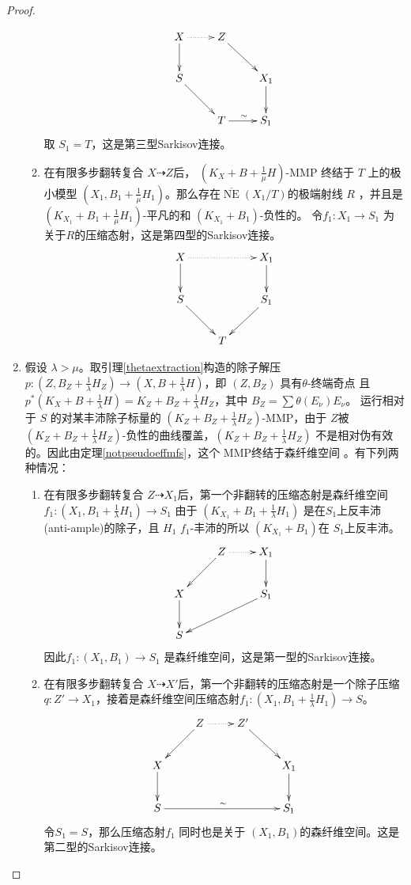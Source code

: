 \begin{proof}
\begin{enumerate}
\begin{enumerate}
      \[ \xymatrix{
          X\ar@{.>}[r]\ar[d]& Z\ar[rd] \\
          S\ar[rd]& & X_{1}\ar[d]\\
               &T\ar[r]^{\sim}& S_{1} } \]
            取 $ S_1=T $，这是第三型Sarkisov连接。
      \item 在有限多步翻转复合 $ X\dashrightarrow Z $后，  $(K_{X}+B+\frac{1}{\mu}H)$-MMP 终结于 $T$ 上的极小模型 $ (X_1,B_1+\frac{1}{\mu}H_1) $。那么存在$ \overline{\operatorname{NE}}(X_1/T) $的极端射线 $R$ ，并且是 $ (K_{X_1}+B_1+\frac{1}{\mu}H_1) $-平凡的和 $ (K_{X_1}+B_1) $-负性的。
            令$ f_1:X_1\to S_1 $ 为 关于$R$的压缩态射，这是第四型的Sarkisov连接。
            \[ \xymatrix{
                X\ar@{.>}[rr]\ar[d]& &X_{1}\ar[d] \\
                S\ar[rd]& & S_{1}\ar[ld]\\
                  &T& } \]
    \end{enumerate}
  \item 假设 $\lambda>\mu$。取引理\ref{thetaextraction}构造的除子解压 $ p:(Z,B_Z+\frac{1}{\lambda}H_Z)\to (X,B+\frac{1}{\lambda}H) $，即   $ (Z,B_Z) $ 具有$ \theta $-终端奇点 且 $ p^*(K_X+B+\frac{1}{\lambda}H)=K_Z+B_Z+\frac{1}{\lambda}H_Z $，其中 $ B_Z=\sum\theta(E_{\nu})E_\nu $。
    运行相对于 $S$ 的对某丰沛除子标量的 $ (K_Z+B_Z+\frac{1}{\lambda}H_Z) $-MMP，由于 $Z$被 $ (K_Z+B_Z+\frac{1}{\lambda}H_Z) $-负性的曲线覆盖，$ (K_Z+B_Z+\frac{1}{\lambda}H_Z) $ 不是相对伪有效的。因此由定理\ref{notpseudoeffmfs}，这个 MMP终结于森纤维空间 。有下列两种情况：
    \begin{enumerate}
      \item 在有限多步翻转复合 $ Z\dashrightarrow X_1 $后，第一个非翻转的压缩态射是森纤维空间$f_1:(X_1,B_1+\frac{1}{\lambda}H_1)\to S_1$ 由于 $ (K_{X_1}+B_1+\frac{1}{\lambda}H_1) $ 是在$S_1$上反丰沛(anti-ample)的除子，且 $ H_1 $  $ f_1 $-丰沛的所以 $(K_{X_1}+B_1) $在 $S_1$上反丰沛。
      \[ \xymatrix{
        &Z\ar@{.>}[r]\ar[ld] &X_{1}\ar[d] \\
          X\ar[d]& &S_{1}\ar[lld]\\
          S   & & } \]
        因此$ f_1:(X_1, B_1)\to S_1 $ 是森纤维空间，这是第一型的Sarkisov连接。
      \item 在有限多步翻转复合 $ X\dashrightarrow X' $后，第一个非翻转的压缩态射是一个除子压缩 $ q:Z'\to X_1 $，接着是森纤维空间压缩态射$f_1:(X_1,B_1+\frac{1}{\lambda}H_1)\to S$。
      \[ \xymatrix{
        &Z\ar@{.>}[r]\ar[ld] &Z'\ar[rd] \\
          X\ar[d]& & &X_{1}\ar[d]\\
          S\ar[rrr]^{\sim}   & & & S_{1} } \]
        令$ S_1=S $，那么压缩态射$f_1$ 同时也是关于 $(X_1, B_1)$的森纤维空间。这是第二型的Sarkisov连接。
    \end{enumerate}
  \end{enumerate}
\end{proof}
